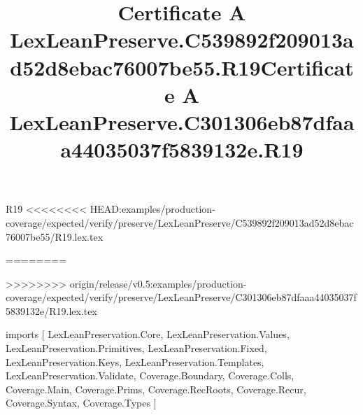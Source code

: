 \begin{lexlean}{R19}
<<<<<<<< HEAD:examples/production-coverage/expected/verify/preserve/LexLeanPreserve/C539892f209013ad52d8ebac76007be55/R19.lex.tex
\title{Certificate A LexLeanPreserve.C539892f209013ad52d8ebac76007be55.R19}
========
\title{Certificate A LexLeanPreserve.C301306eb87dfaaa44035037f5839132e.R19}
>>>>>>>> origin/release/v0.5:examples/production-coverage/expected/verify/preserve/LexLeanPreserve/C301306eb87dfaaa44035037f5839132e/R19.lex.tex
\begin{coremodule}
imports [
  LexLeanPreservation.Core,
  LexLeanPreservation.Values,
  LexLeanPreservation.Primitives,
  LexLeanPreservation.Fixed,
  LexLeanPreservation.Keys,
  LexLeanPreservation.Templates,
  LexLeanPreservation.Validate,
  Coverage.Boundary,
  Coverage.Colls,
  Coverage.Main,
  Coverage.Prims,
  Coverage.RecRoots,
  Coverage.Recur,
  Coverage.Syntax,
  Coverage.Types
]


\end{coremodule}
\end{lexlean}
